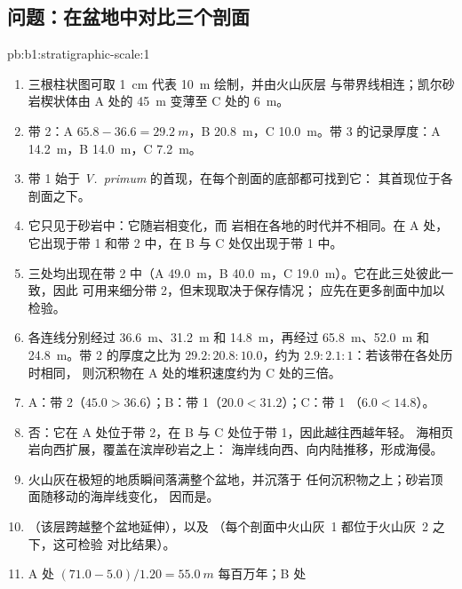 \subsection*{问题：在盆地中对比三个剖面}

\begin{solution}{pb:b1:stratigraphic-scale:1}
\begin{enumerate}
  \item 三根柱状图可取 \qty{1}{cm} 代表 \qty{10}{m} 绘制，并由火山灰层
        与带界线相连；凯尔砂岩楔状体由 A 处的
        \qty{45}{m} 变薄至 C 处的 \qty{6}{m}。
  \item 带 2：A $65.8 - 36.6 = \qty{29.2}{m}$，B \qty{20.8}{m}，C
        \qty{10.0}{m}。带 3 的记录厚度：A \qty{14.2}{m}，B \qty{14.0}{m}，C
        \qty{7.2}{m}。
  \item 带 1 始于 \emph{V.~primum} 的首现，在每个剖面的底部都可找到它：
        其首现位于各剖面之下。
  \item 它只见于砂岩中：它随岩相变化，而
        岩相在各地的时代并不相同。在 A 处，它出现于带 1
        和带 2 中，在 B 与 C 处仅出现于带 1 中。
  \item 三处均出现在带 2 中（A \qty{49.0}{m}，B \qty{40.0}{m}，C
        \qty{19.0}{m}）。它在此三处彼此一致，因此
        可用来细分带 2，但末现取决于保存情况；
        应先在更多剖面中加以检验。
  \item 各连线分别经过 \qty{36.6}{m}、\qty{31.2}{m} 和 \qty{14.8}{m}，再经过
        \qty{65.8}{m}、\qty{52.0}{m} 和 \qty{24.8}{m}。带 2 的厚度之比为
        $29.2 : 20.8 : 10.0$，约为 $2.9 : 2.1 : 1$：若该带在各处历时相同，
        则沉积物在 A 处的堆积速度约为
        C 处的三倍。
  \item A：带 2（$45.0 > 36.6$）；B：带 1（$20.0 < 31.2$）；C：带 1
        （$6.0 < 14.8$）。
  \item 否：它在 A 处位于带 2，在 B 与 C 处位于带 1，因此越往西越年轻。
        海相页岩向西扩展，覆盖在滨岸砂岩之上：
        海岸线向西、向内陆推移，形成海侵。
  \item 火山灰在极短的地质瞬间落满整个盆地，并沉落于
        任何沉积物之上；砂岩顶面随移动的海岸线变化，
        因而是。
  \item {}（该层跨越整个盆地延伸），以及
        （每个剖面中火山灰~1 都位于火山灰~2 之下，这可检验
        对比结果）。
  \item A 处 $(71.0 - 5.0)/1.20 = \qty{55.0}{m}$ 每百万年；B 处

\end{enumerate}
\end{solution}

